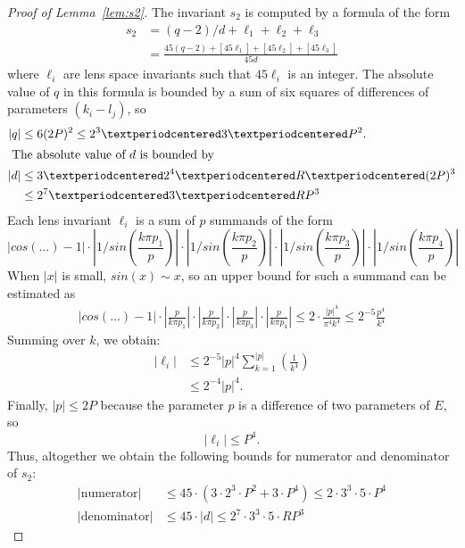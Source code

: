 \documentclass{article}
\newcommand{\abs}[1]{\left|#1\right|}
\begin{document}
\begin{proof}[Proof of Lemma~\ref{lem:s2}]
The invariant \(s_2\) is computed by a formula of the form
\begin{align*}
  s_2   &= (q-2)/d + \ell_1 + \ell_2 + \ell_3\\
        &= \frac{45(q-2) + [45\ell_1] + [45\ell_2] + [45\ell_3]}{45d}
\end{align*}  
where \(\ell_i\) are lens space invariants such that \(45\ell_i\) is an integer.  
The absolute value of \(q\) in this formula is bounded by a sum of six squares of differences of parameters \((k_i-l_j)\), so 
\begin{align}
  \abs{q}&\leq 6(2P)^2 \leq 2^3·3·P^2.\\
  \intertext{
  The absolute value of \(d\) is bounded by}
  \notag 
  \abs{d} &\leq 3 · 2^4 · R · (2P)^3\\
         &\leq 2^7·3·R P^3
\end{align}
Each lens invariant \(\ell_i\) is a sum of \(p\) summands of the form
\[
  \abs{cos(…)-1}
  ·\abs{1/sin\left(\frac{k\pi p_1}{p}\right)}
  ·\abs{1/sin\left(\frac{k\pi p_2}{p}\right)}
  ·\abs{1/sin\left(\frac{k\pi p_3}{p}\right)}
  ·\abs{1/sin\left(\frac{k\pi p_4}{p}\right)}
\]
When \(\abs{x}\) is small, \(sin(x) \sim x\), so an upper bound for such a summand can be estimated as
\begin{align*}
   \abs{cos(…)-1}
    ·\abs{\frac{p}{k\pi p_1}}
    ·\abs{\frac{p}{k\pi p_2}}
    ·\abs{\frac{p}{k\pi p_3}}
    ·\abs{\frac{p}{k\pi p_4}}
 \leq 2·\frac{\abs{p}^4}{\pi^4k^4}
  \leq 2^{-5} \frac{p^4}{k^4} 
\end{align*}
Summing over \(k\), we obtain:
\begin{align*}
  \abs{\ell_i} 
  &\leq 2^{-5}\abs{p}^4 \sum_{k=1}^{\abs{p}}\left(\frac{1}{k^4}\right)\\
  &\leq 2^{-4}\abs{p}^4.
\end{align*}
Finally, \(\abs{p}\leq 2P\)  because the parameter \(p\) is a difference of two parameters of \(E\), so
\begin{equation}
\abs{\ell_i} \leq P^4 .
\end{equation}
Thus, altogether we obtain the following bounds for numerator and denominator of \(s_2\):
\begin{align*}
  \abs{\text{numerator}} &\leq 45·(3·2^3·P^2 + 3·P^4) \leq 2·3^3·5·P^4\\
  \abs{\text{denominator}} &\leq 45·\abs{d} \leq 2^7·3^3·5· R P^3
\end{align*}
\end{proof}
\end{document}
